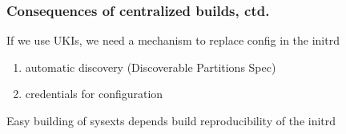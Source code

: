 \documentclass[]{beamer}
\newcommand\pp{}
\begin{document}







\begin{frame}
  \frametitle{Consequences of centralized builds, ctd.}

  If we use UKIs,
  we need a mechanism to replace config in the initrd
  \pp

  \begin{enumerate}
  \item automatic discovery (Discoverable Partitions Spec)\pp
  \item credentials for configuration\pp
  \end{enumerate}

  \vfill{}

  Easy building of sysexts depends build reproducibility of the initrd
\end{frame}







\end{document}
